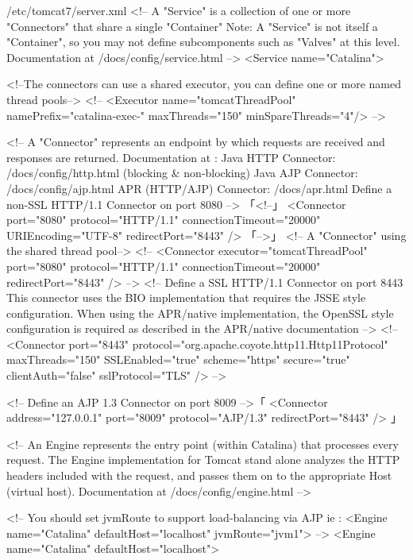 \begin{lstdump}[basicstyle=\ttfamily\footnotesize]{/etc/tomcat7/server.xml}
  <!-- A "Service" is a collection of one or more "Connectors" that share
       a single "Container" Note:  A "Service" is not itself a "Container",
       so you may not define subcomponents such as "Valves" at this level.
       Documentation at /docs/config/service.html
   -->
  <Service name="Catalina">

    <!--The connectors can use a shared executor, you can define one or more named thread pools-->
    <!--
    <Executor name="tomcatThreadPool" namePrefix="catalina-exec-"
        maxThreads="150" minSpareThreads="4"/>
    -->


    <!-- A "Connector" represents an endpoint by which requests are received
         and responses are returned. Documentation at :
         Java HTTP Connector: /docs/config/http.html (blocking & non-blocking)
         Java AJP  Connector: /docs/config/ajp.html
         APR (HTTP/AJP) Connector: /docs/apr.html
         Define a non-SSL HTTP/1.1 Connector on port 8080
    -->
「<!--」
    <Connector port="8080" protocol="HTTP/1.1"
               connectionTimeout="20000"
               URIEncoding="UTF-8"
               redirectPort="8443" />
「-->」
    <!-- A "Connector" using the shared thread pool-->
    <!--
    <Connector executor="tomcatThreadPool"
               port="8080" protocol="HTTP/1.1"
               connectionTimeout="20000"
               redirectPort="8443" />
    -->
    <!-- Define a SSL HTTP/1.1 Connector on port 8443
         This connector uses the BIO implementation that requires the JSSE
         style configuration. When using the APR/native implementation, the
         OpenSSL style configuration is required as described in the APR/native
         documentation -->
    <!--
    <Connector port="8443" protocol="org.apache.coyote.http11.Http11Protocol"
               maxThreads="150" SSLEnabled="true" scheme="https" secure="true"
               clientAuth="false" sslProtocol="TLS" />
    -->

    <!-- Define an AJP 1.3 Connector on port 8009 -->「
    <Connector address="127.0.0.1" port="8009" protocol="AJP/1.3" redirectPort="8443" />
」

    <!-- An Engine represents the entry point (within Catalina) that processes
         every request.  The Engine implementation for Tomcat stand alone
         analyzes the HTTP headers included with the request, and passes them
         on to the appropriate Host (virtual host).
         Documentation at /docs/config/engine.html -->

    <!-- You should set jvmRoute to support load-balancing via AJP ie :
    <Engine name="Catalina" defaultHost="localhost" jvmRoute="jvm1">
    -->
    <Engine name="Catalina" defaultHost="localhost">


\end{lstdump}
